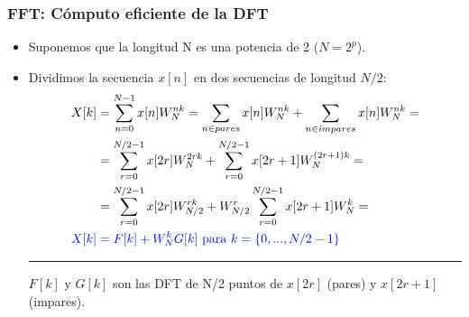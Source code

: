 \documentclass{beamer}
\numberwithin{section}{part}
\begin{document}
\begin{frame}
  \frametitle{FFT: Cómputo eficiente de la DFT}  
  \footnotesize
  
  
  \begin{itemize}
    \item Suponemos que la longitud N es una potencia de 2 ($N=2^p$).
    \item Dividimos la secuencia $x[n]$ en dos secuencias de longitud $N/2$:
    \[
    \begin{aligned}
      X[k]&=\sum_{n=0}^{N-1}x[n]W_N^{nk}=\sum_{n \in pares}  x[n]W_N^{nk} + \sum_{n \in impares}  x[n]W_N^{nk}=\\
          &=\sum_{r=0}^{N/2-1} x[2r] W_N^{2rk}+\sum_{r=0}^{N/2-1} x[2r+1] W_N^{(2r+1)k}=\\
          &=\sum_{r=0}^{N/2-1} x[2r] W_{N/2}^{rk}+W_{N/2}^{r}\sum_{r=0}^{N/2-1} x[2r+1] W_N^k =\\
      \color{blue}
      X[k]&\color{blue}=F[k]+W_N^k G[k]~\text{para}~k=\{0,...,N/2-1\}\color{black}
    \end{aligned}
    \] 
  \rule{11cm}{0.4pt}
  
  $F[k]$ y $G[k]$ son las DFT de N/2 puntos de $x[2r]$ (pares) y $x[2r+1]$ (impares).
  \end{itemize}
\end{frame}
  
\end{document}
